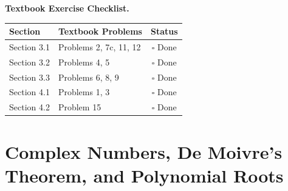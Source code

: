 \documentclass{natsirt}
\newenvironment{reviewbox}[1][]{\begin{whitebox}[#1]\textbf{Textbook Exercise Checklist. }}{\end{whitebox}}
\begin{document}
\begin{reviewbox}
    \begin{center}
    \begin{tabular}{|l|l|c|}
        \hline
        \textbf{Section} & \textbf{Textbook Problems} & \textbf{Status} \\
        \hline
        Section 3.1 & Problems 2, 7c, 11, 12 & $\square$ Done \\
        Section 3.2 & Problems 4, 5 & $\square$ Done \\
        Section 3.3 & Problems 6, 8, 9 & $\square$ Done \\
        Section 4.1 & Problems 1, 3 & $\square$ Done \\
        Section 4.2 & Problem 15 & $\square$ Done \\
        \hline
    \end{tabular}
    \end{center}
\end{reviewbox}


\section{Complex Numbers, De Moivre's Theorem, and Polynomial Roots}
\end{document}
